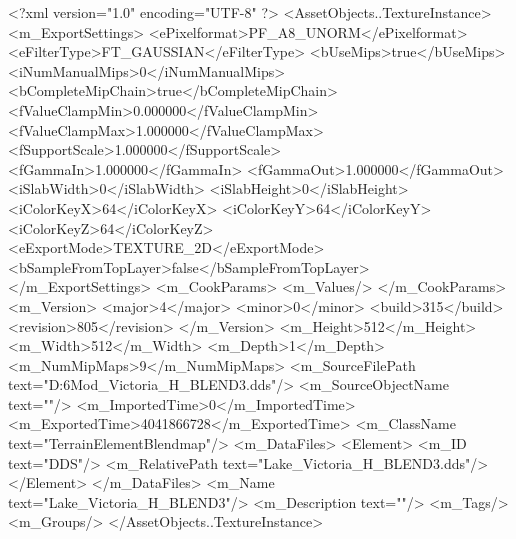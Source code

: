 <?xml version="1.0" encoding="UTF-8" ?>
<AssetObjects..TextureInstance>
	<m_ExportSettings>
		<ePixelformat>PF_A8_UNORM</ePixelformat>
		<eFilterType>FT_GAUSSIAN</eFilterType>
		<bUseMips>true</bUseMips>
		<iNumManualMips>0</iNumManualMips>
		<bCompleteMipChain>true</bCompleteMipChain>
		<fValueClampMin>0.000000</fValueClampMin>
		<fValueClampMax>1.000000</fValueClampMax>
		<fSupportScale>1.000000</fSupportScale>
		<fGammaIn>1.000000</fGammaIn>
		<fGammaOut>1.000000</fGammaOut>
		<iSlabWidth>0</iSlabWidth>
		<iSlabHeight>0</iSlabHeight>
		<iColorKeyX>64</iColorKeyX>
		<iColorKeyY>64</iColorKeyY>
		<iColorKeyZ>64</iColorKeyZ>
		<eExportMode>TEXTURE_2D</eExportMode>
		<bSampleFromTopLayer>false</bSampleFromTopLayer>
	</m_ExportSettings>
	<m_CookParams>
		<m_Values/>
	</m_CookParams>
	<m_Version>
		<major>4</major>
		<minor>0</minor>
		<build>315</build>
		<revision>805</revision>
	</m_Version>
	<m_Height>512</m_Height>
	<m_Width>512</m_Width>
	<m_Depth>1</m_Depth>
	<m_NumMipMaps>9</m_NumMipMaps>
	<m_SourceFilePath text="D:\Civ6Mod\Terrain\NW\LakeVictoria\Lake_Victoria_H_BLEND3.dds"/>
	<m_SourceObjectName text=""/>
	<m_ImportedTime>0</m_ImportedTime>
	<m_ExportedTime>4041866728</m_ExportedTime>
	<m_ClassName text="TerrainElementBlendmap"/>
	<m_DataFiles>
		<Element>
			<m_ID text="DDS"/>
			<m_RelativePath text="Lake_Victoria_H_BLEND3.dds"/>
		</Element>
	</m_DataFiles>
	<m_Name text="Lake_Victoria_H_BLEND3"/>
	<m_Description text=""/>
	<m_Tags/>
	<m_Groups/>
</AssetObjects..TextureInstance>

